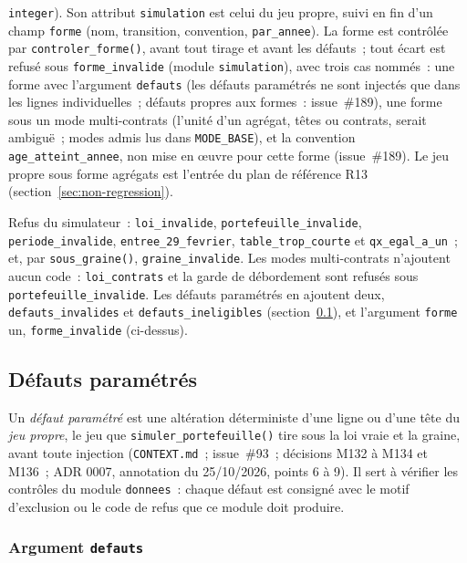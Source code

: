 \documentclass[a4paper,11pt]{article}
\newcommand{\code}[1]{\texttt{\small #1}}
\begin{document}
\code{integer}). Son attribut \code{simulation} est celui du jeu propre,
suivi en fin d'un champ \code{forme} (nom, transition, convention,
\code{par\_annee}). La forme est contrôlée par \code{controler\_forme()},
avant tout tirage et avant les défauts~; tout écart est refusé sous
\code{forme\_invalide} (module \code{simulation}), avec trois cas nommés~:
une forme avec l'argument \code{defauts} (les défauts paramétrés ne sont
injectés que dans les lignes individuelles~; défauts propres aux formes~:
issue~\#189), une forme sous un mode multi-contrats (l'unité d'un agrégat,
têtes ou contrats, serait ambiguë~; modes admis lus dans \code{MODE\_BASE}),
et la convention \code{age\_atteint\_annee}, non mise en œuvre pour cette
forme (issue~\#189). Le jeu propre sous forme agrégats est l'entrée du plan
de référence R13 (section~\ref{sec:non-regression}).

\medskip
{\sloppy{} Refus du simulateur~: \code{loi\_invalide}, \code{portefeuille\_invalide},
\code{periode\_invalide}, \code{entree\_29\_fevrier}, \code{table\_trop\_courte}
et \code{qx\_egal\_a\_un}~; et, par \code{sous\_graine()}, \code{graine\_invalide}.
Les modes multi-contrats n'ajoutent aucun code~: \code{loi\_contrats} et la
garde de débordement sont refusés sous \code{portefeuille\_invalide}. Les
défauts paramétrés en ajoutent deux, \code{defauts\_invalides} et
\code{defauts\_ineligibles} (section~\ref{sec:defauts-parametres}), et
l'argument \code{forme} un, \code{forme\_invalide} (ci-dessus).\par}

\subsection{Défauts paramétrés}
\label{sec:defauts-parametres}

Un \emph{défaut paramétré} est une altération déterministe d'une ligne ou
d'une tête du \emph{jeu propre}, le jeu que \code{simuler\_portefeuille()}
tire sous la loi vraie et la graine, avant toute injection (\code{CONTEXT.md}~;
issue~\#93~; décisions M132 à M134 et M136~; ADR 0007, annotation du
25/10/2026, points 6 à 9). Il sert à vérifier les contrôles du module
\code{donnees}~: chaque défaut est consigné avec le motif d'exclusion ou le
code de refus que ce module doit produire.

\subsubsection*{Argument \code{defauts}}
\end{document}

